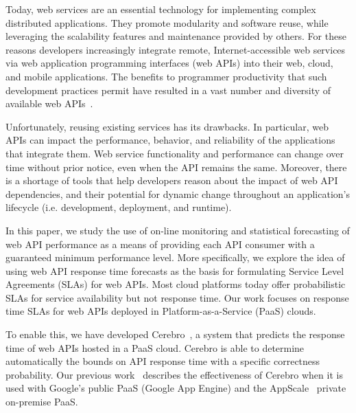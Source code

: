 Today, web services are an essential technology for implementing
complex distributed applications. They promote modularity and software reuse,
while leveraging the scalability features and maintenance 
provided by others. For these reasons developers increasingly integrate remote, 
Internet-accessible web services via web application programming interfaces (web APIs)
into their web, cloud, and mobile applications.  
The benefits to programmer productivity that such development practices
permit have resulted in a vast number and diversity of available web APIs~\cite{pweb}.

Unfortunately, reusing existing services has its drawbacks. In particular, 
web APIs can impact the performance, behavior, and reliability of the applications
that integrate them.  Web service functionality and performance can change over time 
without prior notice, even when the API remains the same.
Moreover, there is a shortage of tools that help developers 
reason about the impact of web API dependencies, and their potential for
dynamic change throughout an application's 
lifecycle (i.e. development, deployment, and runtime).  

In this paper, we study the use of on-line monitoring and statistical
forecasting of web API performance as a means of providing each API
consumer with a guaranteed minimum performance level. 
More specifically, we explore the idea of using web API response time forecasts
as the basis for formulating Service Level Agreements (SLAs)
for web APIs. Most cloud platforms today offer probabilistic
SLAs for service availability but not response time. 
Our work focuses on response time SLAs for web APIs deployed
in Platform-as-a-Service (PaaS) clouds.


To enable this, we have developed Cerebro~\cite{cerebro-soccsub15},
a system that
predicts the response time of web APIs hosted in a PaaS cloud. Cerebro is able to
determine automatically the bounds on API response time with a specific
correctness probability.
Our previous work~\cite{cerebro-soccsub15} describes the effectiveness of
Cerebro when it is used with Google's public PaaS (Google
App Engine) and the AppScale~\cite{6488671} private on-premise PaaS.  

